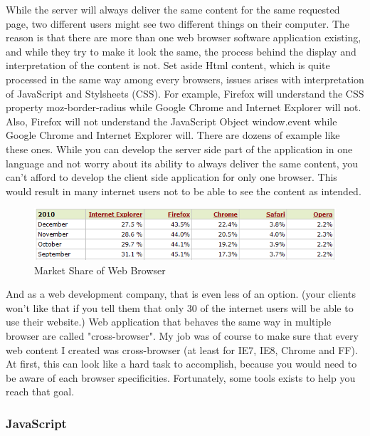 While the server will always deliver the same content for the same requested page, two different users might see two different things on their computer. 
The reason is that there are more than one web browser software application existing, and while they try to make it look the same, the process behind the display and interpretation of the content is not. Set aside Html content, which is quite processed in the same way among every browsers, issues arises with interpretation of
JavaScript and Stylsheets (CSS). For example, Firefox will understand the CSS property moz-border-radius while Google Chrome and Internet Explorer will not. Also, Firefox will not understand the JavaScript Object window.event while Google Chrome and Internet Explorer will. There are dozens of example like these ones.
While you can develop the server side part of the application in one language and not worry about its ability to always deliver the same content, you can't afford to develop the client side application for only one browser. This would result in many internet users not to be able to see the content as intended.
\begin{figure}[!ht]
\centering
\includegraphics[width=.55\textwidth]{img/browser_statistics.png}
\caption{Market Share of Web Browser}
\label{figure:Market Share of Web Browser}
\end{figure}
And as a web development company, that is even less of an option. (your clients won't like that if you tell them that only 30 of the internet users will be able to use their website.)
Web application that behaves the same way in multiple browser are called "cross-browser". 
My job was of course to make sure that every web content I created was cross-browser (at least for IE7, IE8, Chrome and FF).
At first, this can look like a hard task to accomplish, because you would need to be aware of each browser specificities. Fortunately, some tools exists to help you reach that goal.

\subsubsection{JavaScript}

